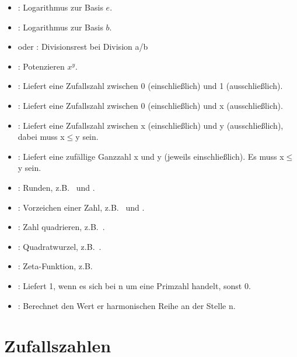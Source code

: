 \begin{itemize}
\item
{}:
Logarithmus zur Basis $e$.

\item
{}:
Logarithmus zur Basis $b$.

\item
{} oder :
Divisionsrest bei Division a/b

\item
{}:
Potenzieren $x^y$.

\item
{}:
Liefert eine Zufallszahl zwischen 0 (einschließlich) und 1 (ausschließlich).

\item
{}:
Liefert eine Zufallszahl zwischen 0 (einschließlich) und x (ausschließlich).

\item
{}:
Liefert eine Zufallszahl zwischen x (einschließlich) und y (ausschließlich), dabei muss x$\le$y sein.

\item
{}:
Liefert eine zufällige Ganzzahl x und y (jeweils einschließlich). Es muss x$\leq$y sein.

\item
{}:
Runden, z.B.\  und .

\item
{}:
Vorzeichen einer Zahl, z.B.\  und .

\item
{}:
Zahl quadrieren, z.B.\ .

\item
{}:
Quadratwurzel, z.B.\ .

\item
{}:
Zeta-Funktion, z.B.\ 

\item
{}:
Liefert 1, wenn es sich bei n um eine Primzahl handelt, sonst 0.

\item
{}:
Berechnet den Wert er harmonischen Reihe an der Stelle n.

\end{itemize}



\section{Zufallszahlen}


